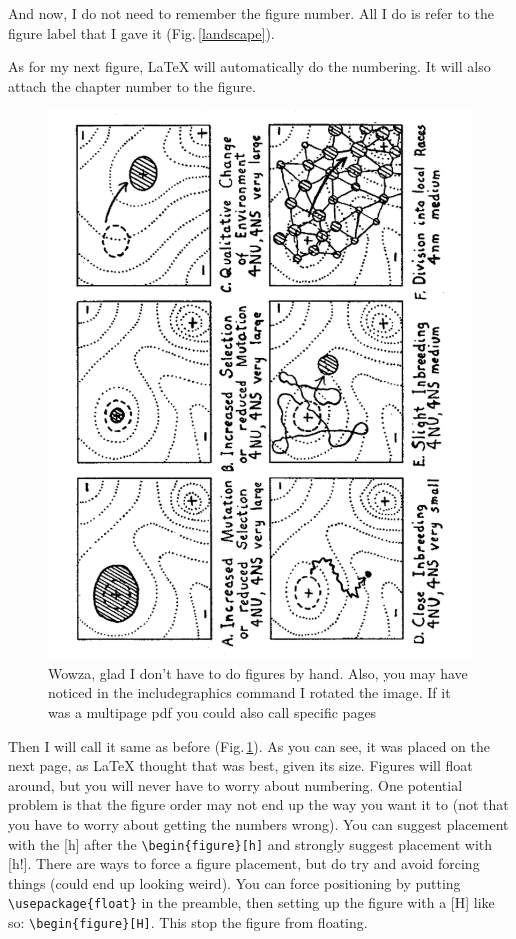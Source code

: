 And now, I do not need to remember the figure number. All I do is refer to the figure label that I gave it (Fig.\,\ref{landscape}).


As for my next figure, \LaTeX{} will automatically do the numbering. It will also attach the chapter number to the figure.



\begin{figure}[h!] %
	\centering
	\includegraphics[scale=0.5, angle=-90]{Figs/Wright_1932_2.pdf}
    \caption[selection]{Wowza, glad I don't have to do figures by hand. Also, you may have noticed in the includegraphics command I rotated the image. If it was a multipage pdf you could also call specific pages}
    \label{bigFig}
\end{figure}

Then I will call it same as before (Fig.\,\ref{bigFig}). As you can see, it was placed on the next page, as \LaTeX{} thought that was best, given its size. Figures will float around, but you will never have to worry about numbering. One potential problem is that the figure order may not end up the way you want it to (not that you have to worry about getting the numbers wrong). You can suggest placement with the [h] after the \verb+\begin{figure}[h]+ and strongly suggest placement with [h!]. There are ways to force a figure placement, but do try and avoid forcing things (could end up looking weird). You can force positioning by putting \verb+\usepackage{float}+ in the preamble, then setting up the figure with a [H] like so: \verb+\begin{figure}[H]+. This stop the figure from floating.

